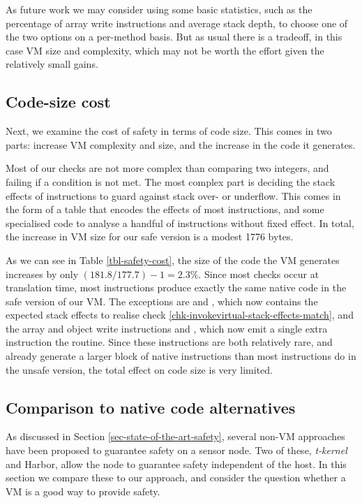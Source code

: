 As future work we may consider using some basic statistics, such as the percentage of array write instructions and average stack depth, to choose one of the two options on a per-method basis. But as usual there is a tradeoff, in this case VM size and complexity, which may not be worth the effort given the relatively small gains.

\subsection{Code-size cost}
Next, we examine the cost of safety in terms of code size. This comes in two parts: increase VM complexity and size, and the increase in the code it generates.

Most of our checks are not more complex than comparing two integers, and failing if a condition is not met. The most complex part is deciding the stack effects of instructions to guard against stack over- or underflow. This comes in the form of a table that encodes the effects of most instructions, and some specialised code to analyse a handful of instructions without fixed effect. In total, the increase in VM size for our safe version is a modest 1776 bytes.

As we can see in Table \ref{tbl-safety-cost}, the size of the code the VM generates increases by only $(181.8/177.7)-1=2.3\%$. Since most checks occur at translation time, most instructions produce exactly the same native code in the safe version of our VM. The exceptions are  and , which now contains the expected stack effects to realise check \ref{chk-invokevirtual-stack-effects-match}, and the array and object write instructions  and , which now emit a single extra  instruction the  routine. Since these instructions are both relatively rare, and already generate a larger block of native instructions than most instructions do in the unsafe version, the total effect on code size is very limited.

\subsection{Comparison to native code alternatives}
As discussed in Section \ref{sec-state-of-the-art-safety}, several non-VM approaches have been proposed to guarantee safety on a sensor node. Two of these, \emph{t-kernel} and Harbor, allow the node to guarantee safety independent of the host. In this section we compare these to our approach, and consider the question whether a VM is a good way to provide safety.

